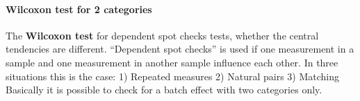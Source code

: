 \documentclass[]{article}
\newenvironment{Shaded}{\begin{snugshade}}{\end{snugshade}}
\newcommand{\KeywordTok}[1]{\textcolor[rgb]{0.13,0.29,0.53}{\textbf{#1}}}
\newcommand{\StringTok}[1]{\textcolor[rgb]{0.31,0.60,0.02}{#1}}
\newcommand{\OperatorTok}[1]{\textcolor[rgb]{0.81,0.36,0.00}{\textbf{#1}}}
\newcommand{\NormalTok}[1]{#1}
\let\oldparagraph\paragraph
\renewcommand{\paragraph}[1]{\oldparagraph{#1}\mbox{}}
\begin{document}
\begin{Shaded}
\end{Shaded}

\paragraph{Wilcoxon test for 2
categories}\label{wilcoxon-test-for-2-categories}

The \textbf{Wilcoxon test} for dependent spot checks tests, whether the
central tendencies are different. ``Dependent spot checks'' is used if
one measurement in a sample and one measurement in another sample
influence each other. In three situations this is the case: 1) Repeated
measures 2) Natural pairs 3) Matching Basically it is possible to check
for a batch effect with two categories only.
\end{document}
